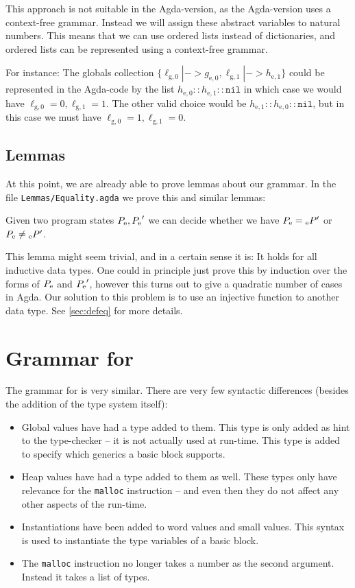 This approach is not suitable in the Agda-version, as the Agda-version uses a
context-free grammar. Instead we will assign these abstract variables to natural
numbers. This means that we can use ordered lists instead of dictionaries, and
ordered lists can be represented using a context-free grammar.

For instance: The globals collection
$\{\ell_{\mathrm{g},0} |-> g_{\mathrm{e},0}, \ell_{\mathrm{g},1} |->
h_{\mathrm{e},1}\}$ could be represented in the Agda-code by the list
$h_{\mathrm{e},0} :: h_{\mathrm{e},1} :: \mathtt{nil}$ in which case we would
have $\ell_{\mathrm{g},0} = 0, \ell_{\mathrm{g},1} = 1$. The other valid choice
would be $h_{\mathrm{e},1} :: h_{\mathrm{e},0} :: \mathtt{nil}$, but in this
case we must have $\ell_{\mathrm{g},0} = 1, \ell_{\mathrm{g},1} = 0$.

\subsection{Lemmas}

At this point, we are already able to prove lemmas about our grammar. In the
file \texttt{Lemmas/Equality.agda} we prove this and similar lemmas:

\begin{lemma} Given two program states ${{P}_{\mathrm{e}}}, {{P}_{\mathrm{e}}}'$ we can decide
  whether we have $\simple P = \simple P'$ or $\simple P \neq \simple P'$.
\end{lemma}

This lemma might seem trivial, and in a certain sense it is: It holds for all
inductive data types. One could in principle just prove this by induction over
the forms of ${{P}_{\mathrm{e}}}$ and ${{P}_{\mathrm{e}}}'$, however this turns out to give a
quadratic number of cases in Agda. Our solution to this problem is to use an
injective function to another data type. See \cref{sec:defeq} for more details.

\section{Grammar for \ATAL}

The grammar for \ATAL is very similar. There are very few syntactic
differences (besides the addition of the type system itself):

\begin{itemize}
\item Global values have had a type added to them. This type is only added as
  hint to the type-checker -- it is not actually used at run-time. This type is
  added to specify which generics a basic block supports.
\item Heap values have had a type added to them as well. These types only have
  relevance for the \texttt{malloc} instruction -- and even then they do not
  affect any other aspects of the run-time.
\item Instantiations have been added to word values and small values. This
  syntax is used to instantiate the type variables of a basic block.
\item The \texttt{malloc} instruction no longer takes a number as the second
  argument. Instead it takes a list of types.
\end{itemize}

